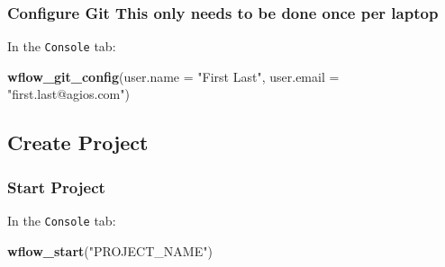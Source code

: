 \documentclass[openany]{book}
\newenvironment{Shaded}{\begin{snugshade}}{\end{snugshade}}
\newcommand{\DataTypeTok}[1]{\textcolor[rgb]{0.13,0.29,0.53}{#1}}
\newcommand{\KeywordTok}[1]{\textcolor[rgb]{0.13,0.29,0.53}{\textbf{#1}}}
\newcommand{\NormalTok}[1]{#1}
\newcommand{\StringTok}[1]{\textcolor[rgb]{0.31,0.60,0.02}{#1}}
\begin{document}
\hypertarget{configure-git-this-only-needs-to-be-done-once-per-laptop}{%
\subsubsection{\texorpdfstring{Configure Git\emph{
}This only needs to be done once per laptop}{Configure Git This only needs to be done once per laptop}}\label{configure-git-this-only-needs-to-be-done-once-per-laptop}}

In the \texttt{Console} tab:

\begin{Shaded}
\begin{Highlighting}[]
\KeywordTok{wflow_git_config}\NormalTok{(}\DataTypeTok{user.name =} \StringTok{"First Last"}\NormalTok{, }\DataTypeTok{user.email =} \StringTok{"first.last@agios.com"}\NormalTok{)}
\end{Highlighting}
\end{Shaded}

\hypertarget{create-project}{%
\subsection{Create Project}\label{create-project}}

\hypertarget{start-project}{%
\subsubsection{Start Project}\label{start-project}}

In the \texttt{Console} tab:

\begin{Shaded}
\begin{Highlighting}[]
\KeywordTok{wflow_start}\NormalTok{(}\StringTok{"PROJECT_NAME"}\NormalTok{)}
\end{Highlighting}
\end{Shaded}
\end{document}
